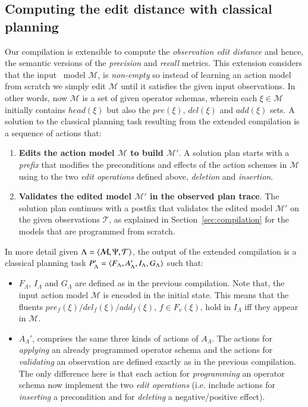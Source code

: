 \subsection{Computing the edit distance with classical planning}
Our compilation is extensible to compute the {\em observation edit distance} and hence, the semantic versions of the {\em precision} and {\em recall} metrics. This extension considers that the input \strips\ model $\mathcal{M}$, is {\em non-empty} so instead of learning an action model from scratch we simply edit $\mathcal{M}$ until it satisfies the given input observations. In other words, now $\mathcal{M}$ is a set of given operator schemas, wherein each $\xi\in\mathcal{M}$ initially contains $head(\xi)$ but also the $pre(\xi)$, $del(\xi)$ and $add(\xi)$ sets. A solution to the classical planning task resulting from the extended compilation is a sequence of actions that:
\begin{enumerate}
\item {\bf Edits the action model $\mathcal{M}$ to build $\mathcal{M}'$}. A solution plan starts with a {\em prefix} that modifies the preconditions and effects of the action schemes in $\mathcal{M}$ using to the two {\em edit operations} defined above, {\em deletion} and {\em insertion}.
\item {\bf Validates the edited model $\mathcal{M}'$ in the observed plan trace}. The solution plan continues with a postfix that validates the edited model $\mathcal{M}'$ on the given observations $\mathcal{T}$, as explained in Section~\ref{sec:compilation} for the models that are programmed from scratch.
\end{enumerate}

In more detail given $\Lambda={\langle \mathcal{M},\Psi,\mathcal{T} \rangle}$, the output of the extended compilation is a classical planning task $P_{\Lambda}'={\langle F_{\Lambda},A_{\Lambda}',I_{\Lambda},G_{\Lambda} \rangle}$ such that:
\begin{itemize}
\item $F_{\Lambda}$, $I_{\Lambda}$ and $G_{\Lambda}$ are defined as in the previous compilation. Note that, the input action model $\mathcal{M}$ is encoded in the initial state. This means that the fluents $pre_f(\xi)/del_f(\xi)/add_f(\xi)$, $f\in F_v(\xi)$, hold in $I_{\Lambda}$ iff they appear in $\mathcal{M}$.
\item $A_{\Lambda}'$, comprises the same three kinds of actions of $A_{\Lambda}$. The actions for {\em applying} an already programmed operator schema and the actions for {\em validating} an observation are defined exactly as in the previous compilation. The only difference here is that each action for {\em programming} an operator schema now implement the two {\em edit operations} (i.e. include actions for {\em inserting} a precondition and for {\em deleting} a negative/positive effect).
\end{itemize}

